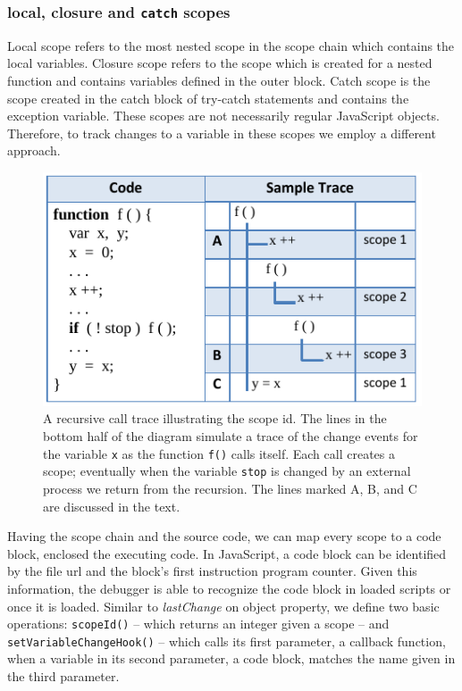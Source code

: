 \documentclass{sig-alternate}
\begin{document}
\subsubsection{local, closure and \texttt{catch} scopes}
Local scope refers to the most nested scope in the scope
chain which contains the local variables. Closure scope refers to the 
scope which is created for a nested function and contains variables 
defined in the outer block. Catch scope is the scope created in the catch
block of try-catch statements and contains the exception
variable. These scopes are not necessarily regular JavaScript
objects.  
Therefore, to track changes to a variable in these scopes we
employ a different approach.


\begin{figure}[htp]
\includegraphics [width=.48\textwidth] {9-scopes.pdf} %




\caption{A recursive call trace illustrating the scope
  id. The lines in the bottom half of the diagram simulate a trace of the change events for the variable \texttt{x} as the function \texttt{f()} calls itself. Each call creates a scope; eventually when the variable \texttt{stop} is changed by an external process we return from the recursion. The lines marked A, B, and C are discussed in the text.}
\label{fig:recursive}
\end{figure}

Having the scope chain and the source code, we can map every scope to %
a code block, enclosed the executing code. In
JavaScript, a code block can be identified by the file url and  
the block's first instruction program counter. Given this information, the debugger is
able to recognize the code block in loaded scripts or once it is loaded.
Similar to \textit{lastChange} on object property, we define two basic operations: 
\texttt{scopeId()} -- which returns an integer given a scope -- and \texttt{setVariableChangeHook()} -- which calls its first parameter, a callback function, when a 
variable in its second parameter, a code block, matches the name given in the third parameter.
\end{document}
